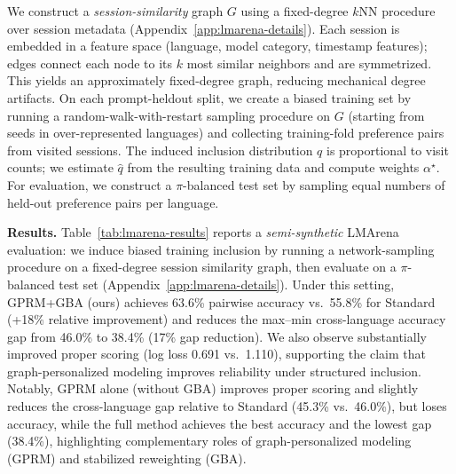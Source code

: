 \documentclass{article}
\theoremstyle{plain}
\theoremstyle{definition}
\theoremstyle{remark}
\begin{document}
We construct a \emph{session-similarity} graph $G$ using a
fixed-degree $k$NN procedure over session metadata (Appendix~\ref{app:lmarena-details}).
Each session is embedded in a feature space (language, model category,
timestamp features); edges connect each node to its $k$ most similar neighbors
and are symmetrized. This yields an approximately fixed-degree graph, reducing
mechanical degree artifacts. On each prompt-heldout split, we create a biased training set by running a
random-walk-with-restart sampling procedure on $G$ (starting from seeds in
over-represented languages) and collecting training-fold preference pairs from
visited sessions. The induced inclusion distribution $q$ is proportional to
visit counts; we estimate $\hat q$ from the resulting training data and compute
weights $\alpha^\star$. For evaluation, we construct a $\pi$-balanced test set
by sampling equal numbers of held-out preference pairs per language.

\textbf{Results.}
Table~\ref{tab:lmarena-results} reports a \emph{semi-synthetic} LMArena evaluation: we
induce biased training inclusion by running a network-sampling procedure on a
fixed-degree session similarity graph, then evaluate on a $\pi$-balanced test
set (Appendix~\ref{app:lmarena-details}). Under this setting, GPRM+GBA (ours)
achieves 63.6\% pairwise accuracy vs.\ 55.8\% for Standard (+18\% relative improvement) and reduces the
max--min cross-language accuracy gap from 46.0\% to 38.4\% (17\% gap reduction). We also
observe substantially improved proper scoring (log loss 0.691 vs.\ 1.110),
supporting the claim that graph-personalized modeling improves reliability under
structured inclusion. Notably, GPRM alone (without GBA) improves proper scoring and slightly reduces the
cross-language gap relative to Standard (45.3\% vs.\ 46.0\%), but loses accuracy, while the full method achieves the best accuracy and the lowest gap (38.4\%),
highlighting complementary roles of graph-personalized modeling (GPRM) and stabilized reweighting (GBA).
\end{document}
